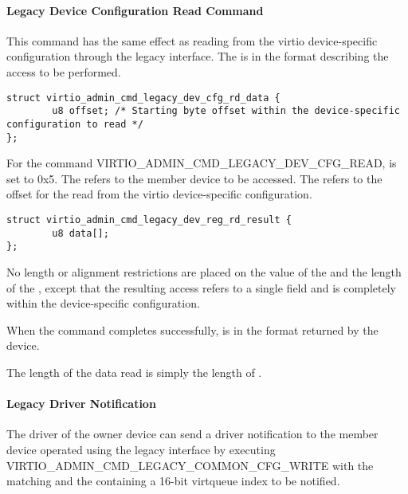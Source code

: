 \paragraph{Legacy Device Configuration Read Command}\label{par:Basic Facilities of a Virtio Device / Device groups / Group administration commands / Legacy Interface / Legacy Device Configuration Read Command}

This command has the same effect as reading from the virtio device-specific
configuration through the legacy interface. The  is in
the format  describing
the access to be performed.

\begin{lstlisting}
struct virtio_admin_cmd_legacy_dev_cfg_rd_data {
        u8 offset; /* Starting byte offset within the device-specific configuration to read */
};
\end{lstlisting}

For the command VIRTIO_ADMIN_CMD_LEGACY_DEV_CFG_READ, 
is set to 0x5.
The  refers to the member device to be accessed.
The  refers to the offset for the read from the virtio device-specific
configuration.

\begin{lstlisting}
struct virtio_admin_cmd_legacy_dev_reg_rd_result {
        u8 data[];
};
\end{lstlisting}

No length or alignment restrictions are placed on the value of the
 and the length of the , except that the resulting
access refers to a single field and is completely within the device-specific
configuration.

When the command completes successfully,  is in
the format 
returned by the device.

The length of the data read is simply the length of .

\paragraph{Legacy Driver Notification}\label{par:Basic Facilities of a Virtio Device / Device groups / Group administration commands / Legacy Interface / Legacy Driver Notifications}

The driver of the owner device can send a driver notification to the member
device operated using the legacy interface by executing
VIRTIO_ADMIN_CMD_LEGACY_COMMON_CFG_WRITE with the  matching
 and the  containing a 16-bit virtqueue index to
be notified.


